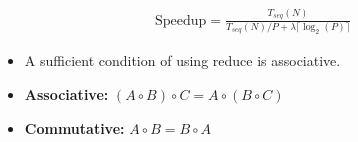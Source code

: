 \documentclass[../main.tex]{subfiles}
\begin{document}
\begin{align*}
	\text{Speedup} = \frac{T_{seq}(N)}{T_{seq}(N) / P + \lambda \lceil \log_2(P) \rceil}
\end{align*}

\begin{itemize}
	\item A sufficient condition of using reduce is associative.
	\item \textbf{Associative:} \((A \circ B) \circ C = A \circ (B \circ C)\)
	\item \textbf{Commutative:} \(A \circ B = B \circ A\)
\end{itemize}
\end{document}

